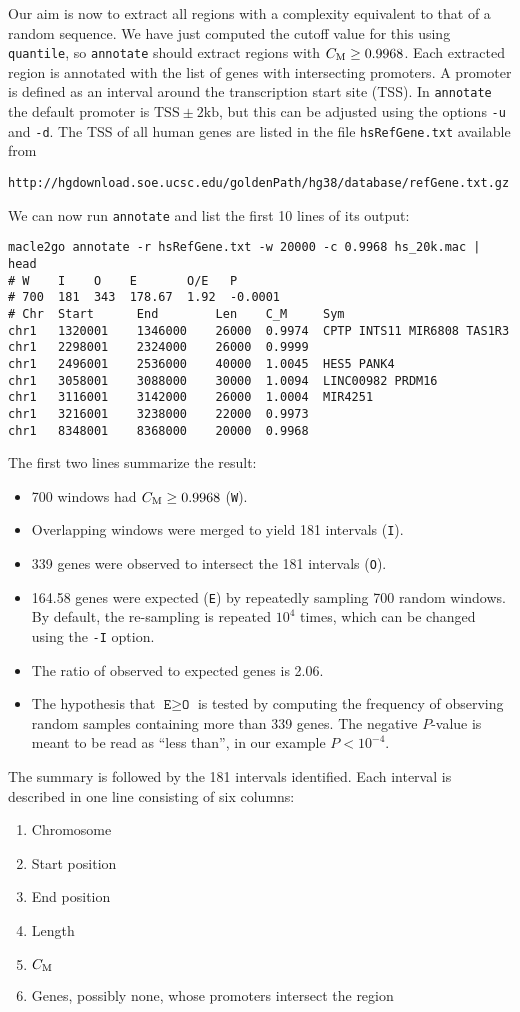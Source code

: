 \documentclass[a4paper]{article}
\newcommand{\ty}{\texttt}
\newcommand{\cm}{C_{\rm M}}
\begin{document}
Our aim is now to extract all regions with a complexity equivalent to
that of a random sequence. We have just computed the cutoff value for
this using \ty{quantile}, so \ty{annotate} should extract regions with
$\cm\ge 0.9968$. Each extracted region is annotated with the list of
genes with intersecting promoters. A promoter is defined as an
interval around the transcription start site (TSS). In \ty{annotate}
the default promoter is $\mathrm{TSS}\pm 2\mathrm{kb}$, but this can
be adjusted using the options \ty{-u} and \ty{-d}. The TSS of all
human genes are listed in the file \ty{hsRefGene.txt} available from
\begin{verbatim}
http://hgdownload.soe.ucsc.edu/goldenPath/hg38/database/refGene.txt.gz
\end{verbatim}
We can now run \ty{annotate} and
list the first 10 lines of its output:
\begin{verbatim}
macle2go annotate -r hsRefGene.txt -w 20000 -c 0.9968 hs_20k.mac | head
# W    I    O    E       O/E   P
# 700  181  343  178.67  1.92  -0.0001
# Chr  Start      End        Len    C_M     Sym
chr1   1320001    1346000    26000  0.9974  CPTP INTS11 MIR6808 TAS1R3
chr1   2298001    2324000    26000  0.9999
chr1   2496001    2536000    40000  1.0045  HES5 PANK4
chr1   3058001    3088000    30000  1.0094  LINC00982 PRDM16
chr1   3116001    3142000    26000  1.0004  MIR4251
chr1   3216001    3238000    22000  0.9973
chr1   8348001    8368000    20000  0.9968
\end{verbatim}
The first two lines summarize the result:
\begin{itemize}
\item 700 windows had $\cm\ge 0.9968$ (\ty{W}).
\item Overlapping windows were merged to yield 181 intervals (\ty{I}).
\item 339 genes were observed to intersect the 181 intervals (\ty{O}).
\item 164.58 genes were expected (\ty{E}) by repeatedly sampling 700 random
  windows. By default, the re-sampling is repeated $10^{4}$ times,
  which can be changed using the \ty{-I} option.
\item The ratio of observed to expected genes is 2.06.
\item The hypothesis that $\ty{E}\ge\ty{O}$ is tested by computing the
  frequency of observing random samples containing more than 339
  genes. The negative $P$-value is meant to be read as ``less
  than'', in our example $P<10^{-4}$.
\end{itemize}
The summary is followed by the 181 intervals identified. Each interval
is described in one line consisting of six columns:
\begin{enumerate}
\item Chromosome
\item Start position
\item End position
\item Length
\item $\cm$
\item Genes, possibly none, whose promoters intersect the region
\end{enumerate}
\end{document}
